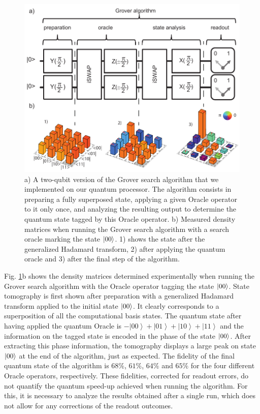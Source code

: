 %
\begin{figure}[ht!]
\centering \includegraphics[width=1\textwidth]{material/figures/2-qubit-processor/grover/grover_schematic_and_density_matrices}
\caption[Schematic of the Grover search algorithm and measured density matrices when running it]{a) A two-qubit version of the Grover search algorithm that we implemented on our quantum processor. The algorithm consists in preparing a fully superposed
state, applying a given Oracle operator to it only
once, and analyzing the resulting output to determine the quantum
state tagged by this Oracle operator. b) Measured density matrices when running the Grover search algorithm
with a search oracle marking the state $\left| 00 \right>$. 1) shows the state
after the generalized Hadamard transform, 2) after applying the quantum
oracle and 3) after the final step of the algorithm.}


\label{fig:grover_algorithm_schematic_and_density_matrices} %
\end{figure}


Fig. \ref{fig:grover_algorithm_schematic_and_density_matrices}b
shows the density matrices determined experimentally when running
the Grover search algorithm with the Oracle operator tagging the
state $\left| 00 \right>$. State tomography is first shown after preparation
with a generalized Hadamard transform applied to the initial state
$\left| 00 \right>$. It clearly corresponds to a superposition of all
the computational basis states. The quantum state after having applied the quantum
Oracle is $-\left|00\right\rangle +\left|01\right\rangle +\left|10\right\rangle +\left|11\right\rangle $
and the information on the tagged state is encoded in the phase of the state $\left| 00 \right>$. After extracting this phase information, the tomography displays a large peak on state $\left| 00 \right>$ at the end of the algorithm, just as expected. The fidelity of the final quantum state of the algorithm
is $68\%$, $61\%$, $64\%$ and $65\%$ for the four different Oracle
operators, respectively. These fidelities, corrected for readout errors,
do not quantify the quantum speed-up achieved when running the algorithm. For this, it is necessary to analyze the results obtained
after a single run, which does not allow for any corrections of the
readout outcomes.


